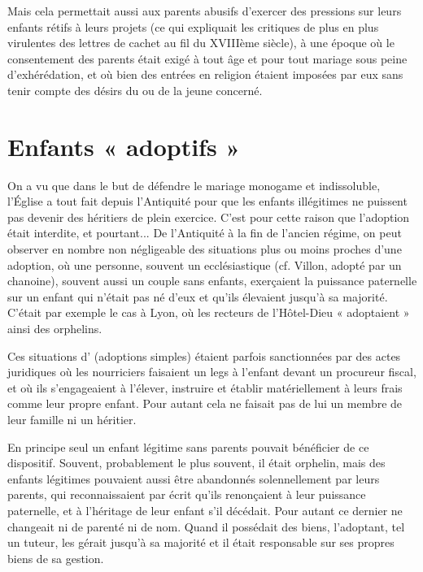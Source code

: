  Mais cela permettait aussi aux parents abusifs d'exercer des pressions sur leurs enfants rétifs à leurs projets (ce qui expliquait les critiques de plus en plus virulentes des lettres de cachet au fil du XVIIIème siècle), à une époque où le consentement des parents était exigé à tout âge et pour tout mariage sous peine d'exhérédation, et où bien des entrées en religion étaient imposées par eux sans tenir compte des désirs du ou de la jeune concerné. 

\section{Enfants « adoptifs »}

 On a vu que dans le but de défendre le mariage monogame et indissoluble, l'Église a tout fait depuis l'Antiquité pour que les enfants illégitimes ne puissent pas devenir des héritiers de plein exercice. C'est pour cette raison que l'adoption était interdite, et pourtant... De l'Antiquité à la fin de l'ancien régime, on peut observer en nombre non négligeable des situations plus ou moins proches d'une adoption, où une personne, souvent un ecclésiastique (cf. \hbox{Villon}, adopté par un chanoine), souvent aussi un couple sans enfants, exerçaient la puissance paternelle sur un enfant qui n'était pas né d'eux et qu'ils élevaient jusqu'à sa majorité. C'était par exemple le cas à Lyon, où les recteurs de l'Hôtel-Dieu « adoptaient » ainsi des orphelins. 

 Ces situations d' (adoptions simples) étaient parfois sanctionnées par des actes juridiques où les nourriciers faisaient un legs à l'enfant devant un procureur fiscal, et où ils s'engageaient à l'élever, instruire et établir matériellement à leurs frais comme leur propre enfant. Pour autant cela ne faisait pas de lui un membre de leur famille ni un héritier. 

 En principe seul un enfant légitime sans parents pouvait bénéficier de ce dispositif. Souvent, probablement le plus souvent, il était orphelin, mais des enfants légitimes pouvaient aussi être abandonnés solennellement par leurs parents, qui reconnaissaient par écrit qu'ils renonçaient à leur puissance paternelle, et à l'héritage de leur enfant s'il décédait. Pour autant ce dernier ne changeait ni de parenté ni de nom. Quand il possédait des biens, l'adoptant, tel un tuteur, les gérait jusqu'à sa majorité et il était responsable sur ses propres biens de sa gestion. 

